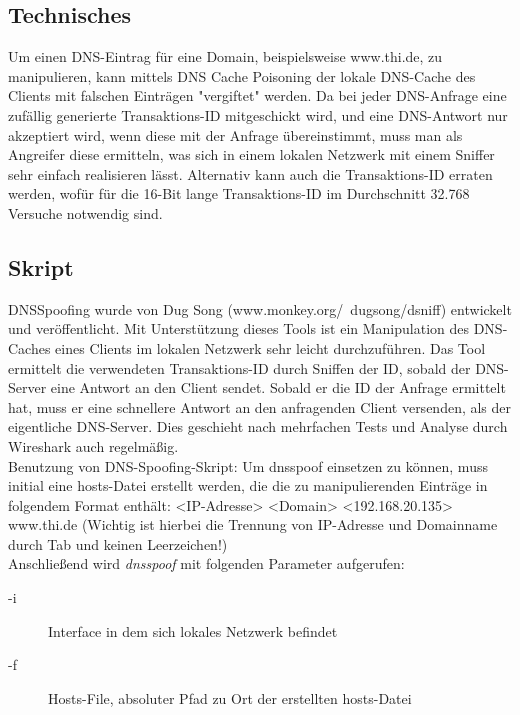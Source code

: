 \subsection*{Technisches}
Um einen DNS-Eintrag für eine Domain, beispielsweise www.thi.de, zu manipulieren, kann mittels DNS Cache Poisoning der lokale DNS-Cache des Clients mit falschen Einträgen "vergiftet" werden.
Da bei jeder DNS-Anfrage eine zufällig generierte Transaktions-ID mitgeschickt wird, und eine DNS-Antwort nur akzeptiert wird, wenn diese mit der Anfrage übereinstimmt, muss man als Angreifer diese ermitteln, was sich in einem lokalen Netzwerk mit einem Sniffer sehr einfach realisieren lässt. Alternativ kann auch die Transaktions-ID erraten werden, wofür für die 16-Bit lange Transaktions-ID im Durchschnitt 32.768 Versuche notwendig sind.

\subsection*{Skript}
DNSSpoofing wurde von Dug Song (www.monkey.org/~dugsong/dsniff) entwickelt und veröffentlicht. Mit Unterstützung dieses Tools ist ein Manipulation des DNS-Caches eines Clients im lokalen
Netzwerk sehr leicht durchzuführen. Das Tool ermittelt die verwendeten Transaktions-ID durch Sniffen der ID, sobald der DNS-Server eine Antwort an den Client sendet. Sobald er die ID der
Anfrage ermittelt hat, muss er eine schnellere Antwort an den anfragenden Client versenden, als der eigentliche DNS-Server. Dies geschieht nach mehrfachen Tests und Analyse durch Wireshark
auch regelmäßig. \\

Benutzung von DNS-Spoofing-Skript: \newline
Um dnsspoof einsetzen zu können, muss initial eine hosts-Datei erstellt werden, die die zu manipulierenden Einträge in folgendem Format enthält: \newline
<IP-Adresse>		<Domain>   \newline
<192.168.20.135>	www.thi.de \newline
(Wichtig ist hierbei die Trennung von IP-Adresse und Domainname durch Tab und keinen Leerzeichen!) \\

Anschließend wird \textit{dnsspoof} mit folgenden Parameter aufgerufen: \newline

\begin{description}
	\item[-i] Interface in dem sich lokales Netzwerk befindet
	\item[-f] Hosts-File, absoluter Pfad zu Ort der erstellten hosts-Datei
\end{description}
	



